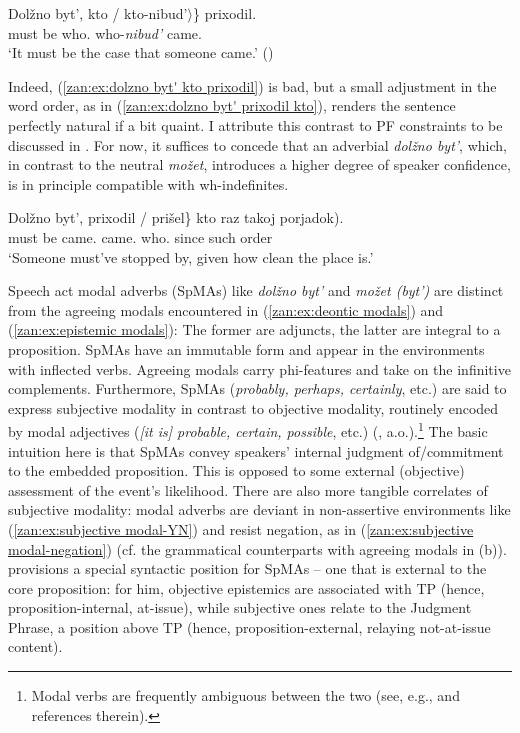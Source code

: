 \documentclass[output=paper,colorlinks,citecolor=brown]{langscibook}
\begin{document}
\ex \label{zan:ex:dolzno byt' kto prixodil}
        \gll Dolžno byt', \minsp{\{*} kto / \minsp{$\langle$}  kto-nibud'$\rangle$\} prixodil. \\
       must be {} who.{\INDF} {} {} {} who-\textit{nibud'} came.{\MASC}\\
      \glt `It must be the case that someone came.' \hfill{(\citealt{yan2005})}
\z
\z

\noindent Indeed, (\ref{zan:ex:dolzno byt' kto prixodil}) is bad, but a small adjustment in the word order, as in (\ref{zan:ex:dolzno byt' prixodil kto}), renders the sentence perfectly natural if a bit quaint. I attribute this contrast to PF constraints to be discussed in . For now, it suffices to concede that an adverbial \textit{dolžno byt'}, which, in contrast to the neutral \textit{možet}, introduces a higher degree of speaker confidence, is in principle compatible with wh-indefinites.       

\ea \label{zan:ex:dolzno byt' prixodil kto}
        \gll Dolžno byt', \minsp{\{} prixodil / prišel\} kto \minsp{(} raz takoj porjadok). \\
      must be {} came.{\IPFV} {} came.{\PFV} who.{\INDF} {} since such order\\
      \glt `Someone must've stopped by, given how clean the place is.'
\z

 \noindent Speech act modal adverbs (SpMAs) like \textit{dolžno byt'} and \textit{možet (byt')} are distinct from the agreeing modals encountered in (\ref{zan:ex:deontic modals}) and (\ref{zan:ex:epistemic modals}): The former are adjuncts, the latter are integral to a proposition. SpMAs have an immutable form and appear in the environments with inflected verbs. Agreeing modals carry phi-features and take on the infinitive complements. Furthermore, SpMAs (\textit{probably, perhaps, certainly}, etc.) are said to express subjective modality in contrast to objective modality, routinely encoded by modal adjectives (\textit{[it is] probable, certain, possible}, etc.) (\citealt{ernst2009speaker, krifka2019layers, wolf2014degrees}, a.o.).\footnote{Modal verbs are frequently ambiguous between the two (see, e.g., \citealt{papafragou2006epistemic} and references therein).} The basic intuition here is that SpMAs convey speakers' internal judgment of/commitment to the embedded proposition. This is opposed to some external (objective) assessment of the event's likelihood. There are also more tangible correlates of subjective modality: modal adverbs are deviant in non-assertive environments like (\ref{zan:ex:subjective modal-YN}) and resist negation, as in (\ref{zan:ex:subjective modal-negation}) (cf. the grammatical counterparts with agreeing modals in (b)). \citet{krifka2017assertions, krifka2019layers} provisions a special syntactic position for SpMAs -- one that is external to the core proposition: for him, objective epistemics are associated with TP (hence, proposition-internal, at-issue), while subjective ones relate to the Judgment Phrase, a position above TP (hence, proposition-external, relaying not-at-issue content).                      
\end{document}
